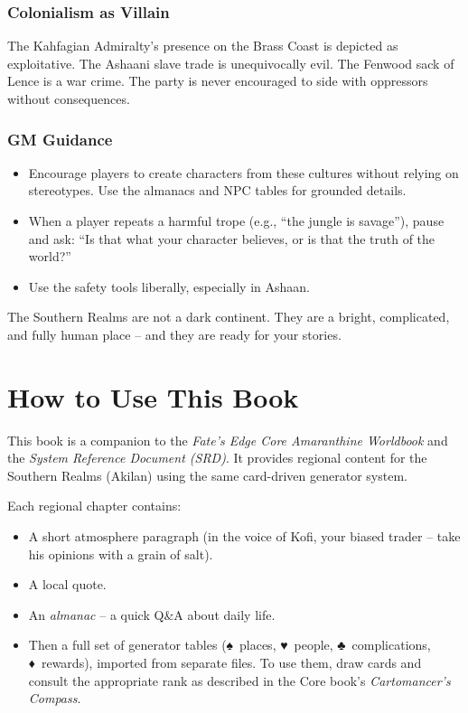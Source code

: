 \documentclass[12pt,oneside]{book}
\newcommand{\spadesuit}{♠}
\newcommand{\heartsuit}{♥}
\newcommand{\clubsuit}{♣}
\newcommand{\diamondsuit}{♦}
\begin{document}
\subsection*{Colonialism as Villain}
The Kahfagian Admiralty's presence on the Brass Coast is depicted as exploitative. The Ashaani slave trade is unequivocally evil. The Fenwood sack of Lence is a war crime. The party is never encouraged to side with oppressors without consequences.

\subsection*{GM Guidance}
\begin{itemize}
  \item Encourage players to create characters from these cultures without relying on stereotypes. Use the almanacs and NPC tables for grounded details.
  \item When a player repeats a harmful trope (e.g., ``the jungle is savage''), pause and ask: ``Is that what your character believes, or is that the truth of the world?''
  \item Use the safety tools liberally, especially in Ashaan.
\end{itemize}

The Southern Realms are not a dark continent. They are a bright, complicated, and fully human place -- and they are ready for your stories.

\chapter*{How to Use This Book}

This book is a companion to the \textit{Fate's Edge Core Amaranthine Worldbook} and the \textit{System Reference Document (SRD)}. It provides regional content for the Southern Realms (Akilan) using the same card-driven generator system.

Each regional chapter contains:
\begin{itemize}
  \item A short atmosphere paragraph (in the voice of Kofi, your biased trader -- take his opinions with a grain of salt).
  \item A local quote.
  \item An \emph{almanac} -- a quick Q\&A about daily life.
  \item Then a full set of generator tables (\spadesuit\ places, \heartsuit\ people, \clubsuit\ complications, \diamondsuit\ rewards), imported from separate files. To use them, draw cards and consult the appropriate rank as described in the Core book's \textit{Cartomancer's Compass}.
\end{itemize}
\end{document}
